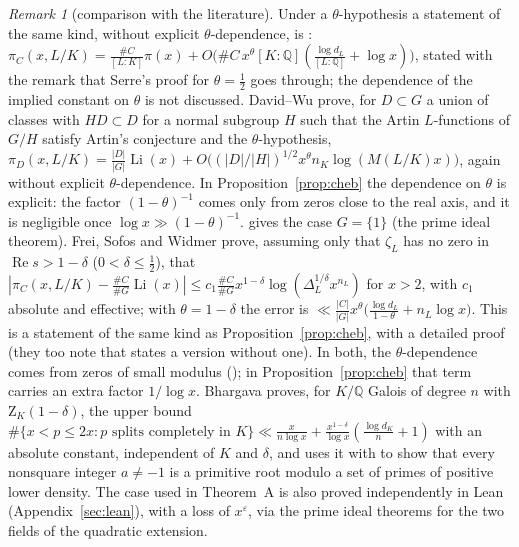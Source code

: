 \documentclass[11pt]{amsart}
\theoremstyle{definition}
\theoremstyle{remark}
\newtheorem{remark}[theorem]{Remark}
\newcommand{\Q}{\mathbb{Q}}
\DeclareMathOperator{\Li}{Li}
\newcommand{\Zt}{\mathrm{Z}}       %
\begin{document}
\begin{remark}[comparison with the literature]\label{rem:cheb-lit}
Under a $\theta$-hypothesis a statement of the same kind, without explicit $\theta$-dependence, is \cite[Thm.~4]{CM}:
$\pi_C(x,L/K)=\frac{\#C}{[L:K]}\pi(x)+O\bigl(\#C\,x^\theta[K:\Q](\frac{\log d_L}{[L:\Q]}+\log x)\bigr)$, stated with the
remark that Serre's proof for $\theta=\frac12$ \cite[Thm.~4]{Serre81} goes through; the dependence of the implied
constant on $\theta$ is not discussed. David--Wu \cite[Thm.~3.8]{DW} prove, for $D\subset G$ a union of classes with
$HD\subset D$ for a normal subgroup $H$ such that the Artin $L$-functions of $G/H$ satisfy Artin's conjecture and the
$\theta$-hypothesis, $\pi_D(x,L/K)=\frac{|D|}{|G|}\Li(x)+O\bigl((|D|/|H|)^{1/2}x^\theta n_K\log(M(L/K)x)\bigr)$, again
without explicit $\theta$-dependence. In Proposition~\ref{prop:cheb} the dependence on $\theta$ is explicit: the factor
$(1-\theta)^{-1}$ comes only from zeros close to the real axis, and it is negligible once $\log x\gg(1-\theta)^{-1}$.
\cite[p.~3]{CT} gives the case $G=\{1\}$ (the prime ideal theorem). Frei, Sofos and Widmer \cite[Thm.~1.1]{FSW}
prove, assuming only that $\zeta_L$ has no zero in $\operatorname{Re}s>1-\delta$ ($0<\delta\le\frac12$), that
$|\pi_C(x,L/K)-\frac{\#C}{\#G}\Li(x)|\le c_1\frac{\#C}{\#G}x^{1-\delta}\log(\Delta_L^{1/\delta}x^{n_L})$ for $x>2$, with
$c_1$ absolute and effective; with $\theta=1-\delta$ the error is
$\ll\frac{|C|}{|G|}x^\theta\bigl(\frac{\log d_L}{1-\theta}+n_L\log x\bigr)$. This is a statement of the same kind as
Proposition~\ref{prop:cheb}, with a detailed proof (they too note that \cite[Thm.~4]{CM} states a version without one).
In both, the $\theta$-dependence comes from zeros of small modulus (\cite[Lemma~2.3]{FSW}); in Proposition~\ref{prop:cheb}
that term carries an extra factor $1/\log x$. Bhargava \cite[Lemma~7]{Bhv} proves, for $K/\Q$ Galois of degree $n$
with $\Zt_K(1-\delta)$, the upper bound
$\#\{x<p\le2x:p\text{ splits completely in }K\}\ll\frac{x}{n\log x}+\frac{x^{1-\delta}}{\log x}(\frac{\log d_K}{n}+1)$
with an absolute constant, independent of $K$ and $\delta$, and uses it with \cite{CT} to show that every nonsquare
integer $a\ne-1$ is a primitive root modulo a set of primes of positive lower density. The case used in Theorem~A is also proved
independently in Lean (Appendix~\ref{sec:lean}), with a loss of $x^\varepsilon$, via the prime ideal theorems for the two
fields of the quadratic extension.
\end{remark}

\end{document}
